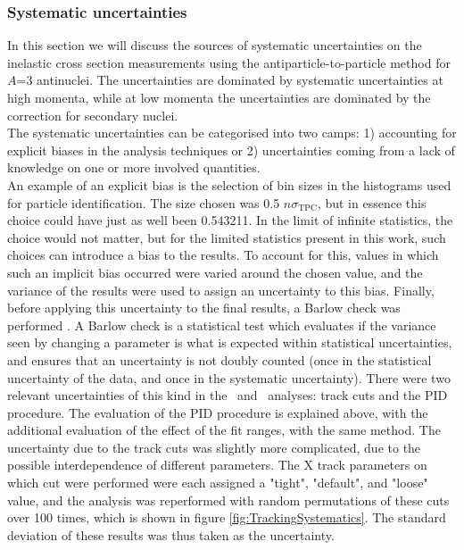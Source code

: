 \subsubsection{Systematic uncertainties}\label{sec:Meth:Systematics}
In this section we will discuss the sources of systematic uncertainties on the inelastic cross section measurements using the antiparticle-to-particle method for $A$=3 antinuclei. The uncertainties are dominated by systematic uncertainties at high momenta, while at low momenta the uncertainties are dominated by the correction for secondary nuclei. \\

The systematic uncertainties can be categorised into two camps: 1) accounting for explicit biases in the analysis techniques or 2) uncertainties coming from a lack of knowledge on one or more involved quantities. \\
An example of an explicit bias is the selection of bin sizes in the histograms used for particle identification. The size chosen was 0.5 $n\sigma_{\mathrm{TPC}}$, but in essence this choice could have just as well been 0.543211. In the limit of infinite statistics, the choice would not matter, but for the limited statistics present in this work, such choices can introduce a bias to the results. To account for this, values in which such an implicit bias occurred were varied around the chosen value, and the variance of the results were used to assign an uncertainty to this bias. Finally, before applying this uncertainty to the final results, a Barlow check was performed \cite{Barlow:2002yb}. A Barlow check is a statistical test which evaluates if the variance seen by changing a parameter is what is expected within statistical uncertainties, and ensures that an uncertainty is not doubly counted (once in the statistical uncertainty of the data, and once in the systematic uncertainty). There were two relevant uncertainties of this kind in the \ahe\ and \atrit\ analyses: track cuts and the PID procedure. The evaluation of the PID procedure is explained above, with the additional evaluation of the effect of the fit ranges, with the same method. The uncertainty due to the track cuts was slightly more complicated, due to the possible interdependence of different parameters. The X track parameters on which cut were performed were each assigned a "tight", "default", and "loose" value, and the analysis was reperformed with random permutations of these cuts over 100 times, which is shown in figure \ref{fig:TrackingSystematics}. The standard deviation of these results was thus taken as the uncertainty. \\


